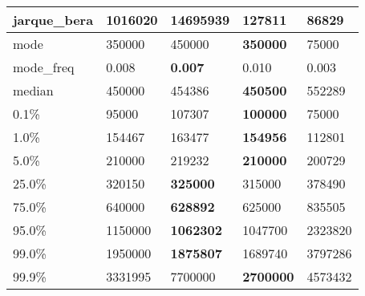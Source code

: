 \begin{table}[H]
\begin{tabular}{|l|m{10em}|m{10em}|m{10em}|m{10em}|}
\hline jarque\_bera & 1016020 & \cellcolor[rgb]{0.9, 0.54, 0.52} 14695939 & \bfseries 127811 & 86829 \\
\hline mode & 350000 & 450000 & \bfseries 350000 & \cellcolor[rgb]{0.9, 0.54, 0.52} 75000 \\
\hline mode\_freq & 0.008 & \bfseries 0.007 & 0.010 & \cellcolor[rgb]{0.9, 0.54, 0.52} 0.003 \\
\hline median & 450000 & 454386 & \bfseries 450500 & \cellcolor[rgb]{0.9, 0.54, 0.52} 552289 \\
\hline 0.1\% & 95000 & 107307 & \bfseries 100000 & \cellcolor[rgb]{0.9, 0.54, 0.52} 75000 \\
\hline 1.0\% & 154467 & 163477 & \bfseries 154956 & \cellcolor[rgb]{0.9, 0.54, 0.52} 112801 \\
\hline 5.0\% & 210000 & 219232 & \bfseries 210000 & \cellcolor[rgb]{0.9, 0.54, 0.52} 200729 \\
\hline 25.0\% & 320150 & \bfseries 325000 & 315000 & \cellcolor[rgb]{0.9, 0.54, 0.52} 378490 \\
\hline 75.0\% & 640000 & \bfseries 628892 & 625000 & \cellcolor[rgb]{0.9, 0.54, 0.52} 835505 \\
\hline 95.0\% & 1150000 & \bfseries 1062302 & 1047700 & \cellcolor[rgb]{0.9, 0.54, 0.52} 2323820 \\
\hline 99.0\% & 1950000 & \bfseries 1875807 & 1689740 & \cellcolor[rgb]{0.9, 0.54, 0.52} 3797286 \\
\hline 99.9\% & 3331995 & \cellcolor[rgb]{0.9, 0.54, 0.52} 7700000 & \bfseries 2700000 & 4573432 \\
\hline
\end{tabular}
\end{table}
